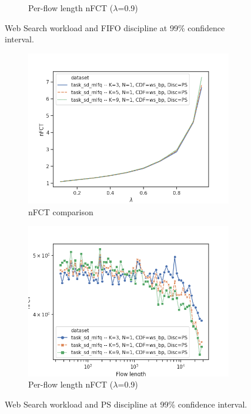 \begin{figure}
\begin{subfigure}{.5\textwidth}
		\caption{Per-flow length nFCT ($\lambda$=0.9)}
		\label{fig:lb-var-K-fifo-detailed}
	\end{subfigure}
	\caption{Web Search workload and FIFO discipline at 99\% confidence interval.}
	\label{fig:lb-var-K-fifo}
\end{figure}
\begin{figure}
	\centering
	\begin{subfigure}{.5\textwidth}
		\centering
		\includegraphics[width=0.99\textwidth]{Chapter3/Figures/lb_opt_vs_nopt_comparison_fifo}
		\caption{nFCT comparison}
	\end{subfigure}%
	\hfill
	\begin{subfigure}{.5\textwidth}
		\centering
		\includegraphics[width=0.99\textwidth]{Chapter3/Figures/lb_opt_vs_nopt_detailed_ps}
		\caption{Per-flow length nFCT ($\lambda$=0.9)}
		\label{fig:lb-var-K-ps-detailed}
	\end{subfigure}
	\caption{Web Search workload and PS discipline at 99\% confidence interval.}
	\label{fig:lb-var-K-ps}
\end{figure}

